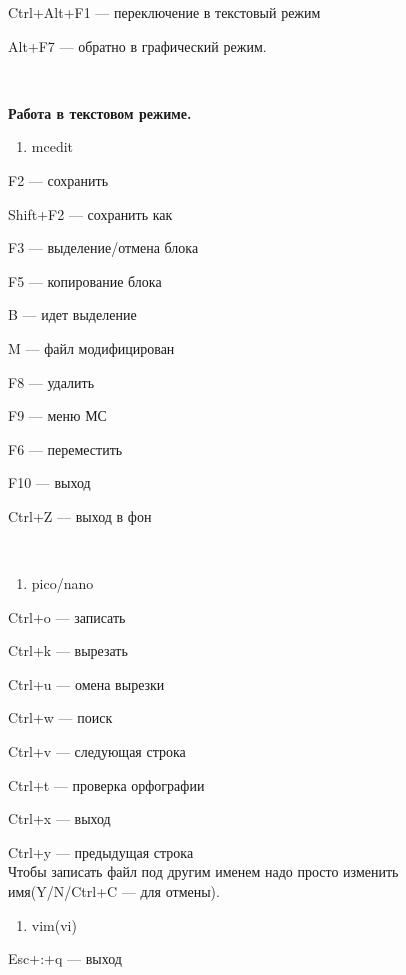 \par 
Ctrl+Alt+F1 — переключение в текстовый режим
\par 
Alt+F7 — обратно в графический режим.
\par 
\\

\par 
\textbf{Работа в текстовом режиме.}
\begin{enumerate}
	\item \par 
	mcedit
\end{enumerate}
\par 
F2 — сохранить
\par 
Shift+F2 — сохранить как
\par 
F3 — выделение/отмена блока
\par 
F5 — копирование блока
\par 
B — идет выделение
\par 
M — файл модифицирован
\par 
F8 — удалить 

\par 
F9 — меню МС
\par 
F6 — переместить 

\par 
F10 — выход 

\par 
Ctrl+Z — выход в фон
\par 
\\

\begin{enumerate}
	\item \par 
	pico/nano
\end{enumerate}
\par 
Ctrl+o — записать 

\par 
Ctrl+k — вырезать 

\par 
Ctrl+u — омена вырезки
\par 
Ctrl+w — поиск 

\par 
Ctrl+v — следующая строка
\par 
Ctrl+t — проверка орфографии
\par 
Ctrl+x — выход  

\par 
Ctrl+y — предыдущая строка\\Чтобы записать
файл под другим именем надо просто
изменить имя(Y/N/Ctrl+C — для отмены).
\begin{enumerate}
	\item \par 
	vim(vi)
\end{enumerate}
\par 
Esc+:+q — выход 

